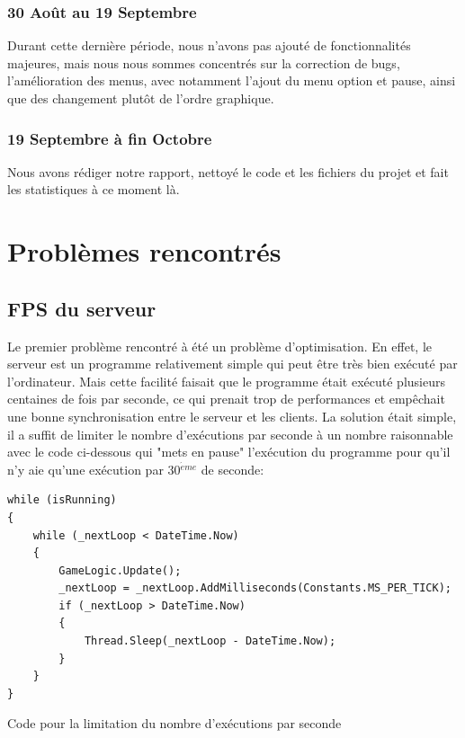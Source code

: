 \documentclass[a4paper]{article}
\begin{document}
\subsubsection{30 Août au 19 Septembre}
Durant cette dernière période, nous n'avons pas ajouté de fonctionnalités majeures, mais nous nous sommes concentrés sur la correction de bugs, l'amélioration des menus, avec notamment l'ajout du menu option et pause, ainsi que des changement plutôt de l'ordre graphique. 

\subsubsection{19 Septembre à fin Octobre}
Nous avons rédiger notre rapport, nettoyé le code et les fichiers du projet et fait les statistiques à ce moment là.

\section{Problèmes rencontrés}
\subsection{FPS du serveur}
Le premier problème rencontré à été un problème d'optimisation. En effet, le serveur est un programme relativement simple qui peut être très bien exécuté par l'ordinateur. Mais cette facilité faisait que le programme était exécuté plusieurs centaines de fois par seconde, ce qui prenait trop de performances et empêchait une bonne synchronisation entre le serveur et les clients. La solution était simple, il a suffit de limiter le nombre d'exécutions par seconde à un nombre raisonnable avec le code ci-dessous qui "mets en pause" l'exécution du programme pour qu'il n'y aie qu'une exécution par 30$^{\acute{e}me}$ de seconde:

\begin{listing}[!h]
\begin{verbatim}
while (isRunning)
{
    while (_nextLoop < DateTime.Now)
    {
        GameLogic.Update();
        _nextLoop = _nextLoop.AddMilliseconds(Constants.MS_PER_TICK);
        if (_nextLoop > DateTime.Now)
        {
            Thread.Sleep(_nextLoop - DateTime.Now);
        }
    }
}
\end{verbatim}
\caption{Code pour la limitation du nombre d'exécutions par seconde}
\label{extrait:fps}
\end{listing}
\end{document}
